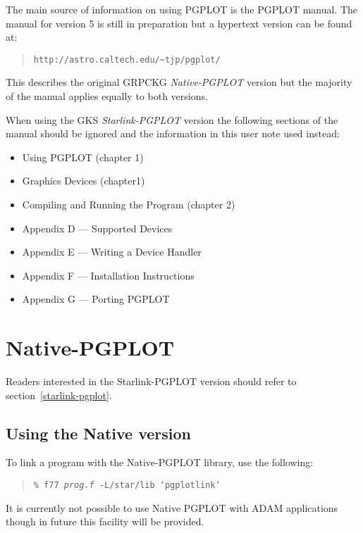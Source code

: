 \documentclass[twoside,11pt]{article}
\newcommand{\htmladdnormallink}[2]{#1}
\newcommand{\htmlref}[2]{#1}
\newcommand{\latexhtml}[2]{#1}
\newcommand{\xlabel}[1]{}
\renewcommand{\_}{\texttt{\symbol{95}}}
\begin{document}
The main source of information on using PGPLOT is the PGPLOT manual.
The manual for version 5 is still in preparation but a hypertext version
can be found at:
\begin{quote}
\texttt{\htmladdnormallink{http://astro.caltech.edu/\~{}tjp/pgplot/}{http://astro.caltech.edu/\~{}tjp/pgplot/}}
\end{quote}

This describes the original GRPCKG \emph{Native-PGPLOT} version but the
majority of the manual applies equally to both versions.

When using the GKS \emph{Starlink-PGPLOT} version the following
sections of the manual should be ignored and the information in this
user note used instead:

\begin{itemize}
\item Using PGPLOT (chapter 1)
\item Graphics Devices (chapter1)
\item Compiling and Running the Program (chapter 2)
\item Appendix D --- Supported Devices
\item Appendix E --- Writing a Device Handler
\item Appendix F --- Installation Instructions
\item Appendix G --- Porting PGPLOT
\end{itemize}

\section{\xlabel{native-pgplot}Native-PGPLOT}
\label{native-pgplot}

Readers interested in the Starlink-PGPLOT version should refer to 
section~\latexhtml{\ref{starlink-pgplot}} %
{\htmlref{\emph{Starlink-PGPLOT}}{starlink-pgplot}}.

\subsection{\xlabel{using_the_native_version}Using the Native version}
\label{using_the_native_version}

To link a program with the Native-PGPLOT library, use the following:

\begin{quote}
\texttt{\% f77 \emph{prog.f} -L/star/lib `pgplot\_link`}
\end{quote}

It is currently not possible to use Native PGPLOT with ADAM applications
though in future this facility will be provided.
\end{document}
